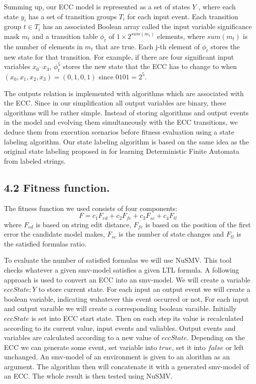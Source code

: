 \documentclass[fleqn,twocolumn]{article}
\begin{document}
Summing up, our ECC model is represented as a set of states $Y$ , where each state $y_i$ has a set of transition groups $T_i$ for each input event.
Each transition group $t \in T_i$ has an associated Boolean array called the input variable significance mask $m_t$ and a transition table $\phi_t$ of $1 \times 2^{sum(m_t)}$
elements, where $sum(m_t)$ is the number of elements in $m_t$ that are true. Each j-th element of $\phi_t$ stores the new state for that transition. For example,
if there are four significant input variables $x_0–x_3$, $\phi_t^5$ stores the new state that the ECC has to change to when $(x_0, x_1, x_2, x_3) = (0, 1, 0, 1)$
since $0101 = 2^5$.

The outputs relation is implemented with algorithms which are associated with the ECC. Since in our simplification all output variables are binary,
these algorithms will be rather simple. Instead of storing algorithms and output events in the model and evolving them simultaneously with the ECC
transitions, we deduce them from execution scenarios before fitness evaluation using a state labeling algorithm. Our state labeling algorithm is based
on the same idea as the original state labeling proposed in \cite{ldfa} for learning Deterministic Finite Automata from labeled strings.

\subsection{4.2 Fitness function.}

The fitness function we used consists of four components:
$$
F = c_1F_{ed} + c_2F_{fe} + c_3F_{sc} + c_4F_{tl}
$$
where $F_{ed}$ is based on string edit distance, $F_{fe}$ is based on the position of the first error the candidate model makes, $F_{sc}$ is the number of state changes
and $F_{tl}$ is the satisfied formulas ratio.

To evaluate the number of satisfied formulas we will use NuSMV. This tool checks whatever a given smv-model satisfies a given LTL formula. A following approach is used
to convert an ECC into an smv-model. We will create a variable $eccState : Y$ to store current state. For each input an output event we will create a boolean variable,
indicating wahatever this event occurred or not, For each input and output varaible we will create a corresponding boolean varaible.
Initially $eccState$ is set into ECC start state. Then on each step its value is recalculated according to its current value, input events and valiables. Output events
and variables are calculated according to a new value of $eccState$. Depending on the ECC we can generate some event, set variable into $true$, set it into $false$ or
left unchanged.
An smv-model of an environment is given to an alorithm as an argument. The algorithm then will concatenate it with a generated smv-model of an ECC. The whole result
is then tested using NuSMV.
\end{document}
